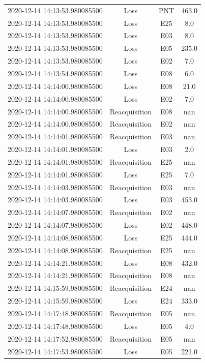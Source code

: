 \begin{enumerate}
\begin{longtabu}{cccc}
2020{-}12{-}14 14:13:53.980085500&Loss&PNT&463.0\\%
2020{-}12{-}14 14:13:53.980085500&Loss&E25&8.0\\%
2020{-}12{-}14 14:13:53.980085500&Loss&E03&8.0\\%
2020{-}12{-}14 14:13:53.980085500&Loss&E05&235.0\\%
2020{-}12{-}14 14:13:53.980085500&Loss&E02&7.0\\%
2020{-}12{-}14 14:13:54.980085500&Loss&E08&6.0\\%
2020{-}12{-}14 14:14:00.980085500&Loss&E08&21.0\\%
2020{-}12{-}14 14:14:00.980085500&Loss&E02&7.0\\%
2020{-}12{-}14 14:14:00.980085500&Reacquisition&E08&nan\\%
2020{-}12{-}14 14:14:00.980085500&Reacquisition&E02&nan\\%
2020{-}12{-}14 14:14:01.980085500&Reacquisition&E03&nan\\%
2020{-}12{-}14 14:14:01.980085500&Loss&E03&2.0\\%
2020{-}12{-}14 14:14:01.980085500&Reacquisition&E25&nan\\%
2020{-}12{-}14 14:14:01.980085500&Loss&E25&7.0\\%
2020{-}12{-}14 14:14:03.980085500&Reacquisition&E03&nan\\%
2020{-}12{-}14 14:14:03.980085500&Loss&E03&453.0\\%
2020{-}12{-}14 14:14:07.980085500&Reacquisition&E02&nan\\%
2020{-}12{-}14 14:14:07.980085500&Loss&E02&448.0\\%
2020{-}12{-}14 14:14:08.980085500&Loss&E25&444.0\\%
2020{-}12{-}14 14:14:08.980085500&Reacquisition&E25&nan\\%
2020{-}12{-}14 14:14:21.980085500&Loss&E08&432.0\\%
2020{-}12{-}14 14:14:21.980085500&Reacquisition&E08&nan\\%
2020{-}12{-}14 14:15:59.980085500&Reacquisition&E24&nan\\%
2020{-}12{-}14 14:15:59.980085500&Loss&E24&333.0\\%
2020{-}12{-}14 14:17:48.980085500&Reacquisition&E05&nan\\%
2020{-}12{-}14 14:17:48.980085500&Loss&E05&4.0\\%
2020{-}12{-}14 14:17:52.980085500&Reacquisition&E05&nan\\%
2020{-}12{-}14 14:17:53.980085500&Loss&E05&221.0\\%

\end{longtabu}
\end{enumerate}
